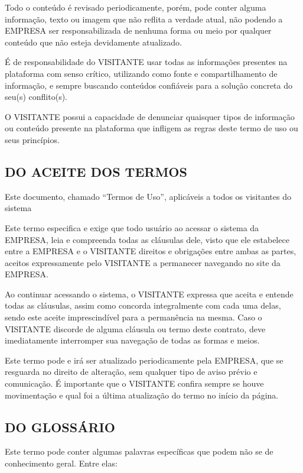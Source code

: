 Todo o conteúdo é revisado periodicamente, porém, pode conter alguma informação, texto ou imagem que não reflita a verdade atual, não podendo a EMPRESA ser responsabilizada de nenhuma forma ou meio por qualquer conteúdo que não esteja devidamente atualizado.

É de responsabilidade do VISITANTE usar todas as informações presentes na plataforma com senso crítico, utilizando como fonte e compartilhamento de informação, e sempre buscando conteúdos confiáveis para a solução concreta do seu(s) conflito(s).

O VISITANTE possui a capacidade de denunciar quaisquer tipos de informação ou conteúdo presente na plataforma que infligem as regras deste termo de uso ou seus princípios.

\subsection{DO ACEITE DOS TERMOS}
 
Este documento, chamado ``Termos de Uso'', aplicáveis a todos os visitantes do sistema

Este termo especifica e exige que todo usuário ao acessar o sistema da EMPRESA, leia e compreenda todas as cláusulas dele, visto que ele estabelece entre a EMPRESA e o VISITANTE direitos e obrigações entre ambas as partes, aceitos expressamente pelo VISITANTE a permanecer navegando no site da EMPRESA.

Ao continuar acessando o sistema, o VISITANTE expressa que aceita e entende todas as cláusulas, assim como concorda integralmente com cada uma delas, sendo este aceite imprescindível para a permanência na mesma. Caso o VISITANTE discorde de alguma cláusula ou termo deste contrato, deve imediatamente interromper sua navegação de todas as formas e meios.

Este termo pode e irá ser atualizado periodicamente pela EMPRESA, que se resguarda no direito de alteração, sem qualquer tipo de aviso prévio e comunicação. É importante que o VISITANTE confira sempre se houve movimentação e qual foi a última atualização do termo no início da página.

\subsection{DO GLOSSÁRIO}
 
Este termo pode conter algumas palavras específicas que podem não se de conhecimento geral. Entre elas:

